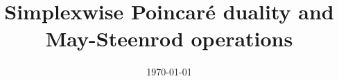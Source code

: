 \documentclass{amsart}
\title[Short title]{Simplexwise Poincar\'e duality and May-Steenrod operations}
\date{\today}
\begin{document}
	
	\maketitle
	
	
	
	
	\sloppy
	\printbibliography
\end{document}
